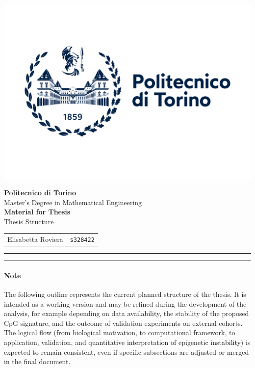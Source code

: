 \documentclass[10pt]{extarticle}
\begin{document}
\noindent
\begin{minipage}{0.3\textwidth}
    \includegraphics[width=1.3\linewidth]{Figures/polito_logo_2021_blu.jpg}
\end{minipage}
\hfill
\begin{minipage}{0.68\textwidth}
    \raggedleft
    {\LARGE \textbf{Politecnico di Torino}}\\[0.2cm]
    {\large Master's Degree in Mathematical Engineering}\\[0.7cm]
    {\large \textbf{Material for Thesis}}\\[0.2cm]
    {\large Thesis Structure}\\[0.7cm]
    \begin{tabular}{rl}
        Elisabetta Roviera & \texttt{s328422} \\
    \end{tabular}
\end{minipage}

\vspace{1cm}
\hrule
\vspace{0.5cm}

\tableofcontents

\vspace{0.5cm}
\hrule
\vspace{1cm}

\paragraph{Note} 
The following outline represents the current planned structure of the thesis. 
It is intended as a working version and may be refined during the development of the analysis, 
for example depending on data availability, the stability of the proposed CpG signature, 
and the outcome of validation experiments on external cohorts. 
The logical flow (from biological motivation, to computational framework, to application, validation, 
and quantitative interpretation of epigenetic instability) is expected to remain consistent, 
even if specific subsections are adjusted or merged in the final document.
\end{document}
